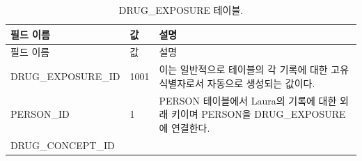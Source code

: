 \documentclass[10.5pt]{book}
\theoremstyle{definition}
\theoremstyle{definition}
\theoremstyle{definition}
\theoremstyle{remark}
\begin{document}
\begin{longtable}[]{@{}lll@{}}
\caption{\label{tab:drugExposure} DRUG\_EXPOSURE 테이블.}\tabularnewline
\toprule
\begin{minipage}[b]{0.28\columnwidth}\raggedright\strut
필드 이름\strut
\end{minipage} & \begin{minipage}[b]{0.16\columnwidth}\raggedright\strut
값\strut
\end{minipage} & \begin{minipage}[b]{0.48\columnwidth}\raggedright\strut
설명\strut
\end{minipage}\tabularnewline
\midrule
\endfirsthead
\toprule
\begin{minipage}[b]{0.28\columnwidth}\raggedright\strut
필드 이름\strut
\end{minipage} & \begin{minipage}[b]{0.16\columnwidth}\raggedright\strut
값\strut
\end{minipage} & \begin{minipage}[b]{0.48\columnwidth}\raggedright\strut
설명\strut
\end{minipage}\tabularnewline
\midrule
\endhead
\begin{minipage}[t]{0.28\columnwidth}\raggedright\strut
DRUG\_EXPOSURE\_ID\strut
\end{minipage} & \begin{minipage}[t]{0.16\columnwidth}\raggedright\strut
1001\strut
\end{minipage} & \begin{minipage}[t]{0.48\columnwidth}\raggedright\strut
이는 일반적으로 테이블의 각 기록에 대한 고유 식별자로서 자동으로
생성되는 값이다.\strut
\end{minipage}\tabularnewline
\begin{minipage}[t]{0.28\columnwidth}\raggedright\strut
PERSON\_ID\strut
\end{minipage} & \begin{minipage}[t]{0.16\columnwidth}\raggedright\strut
1\strut
\end{minipage} & \begin{minipage}[t]{0.48\columnwidth}\raggedright\strut
PERSON 테이블에서 Laura의 기록에 대한 외래 키이며 PERSON을
DRUG\_EXPOSURE에 연결한다.\strut
\end{minipage}\tabularnewline
\begin{minipage}[t]{0.28\columnwidth}\raggedright\strut
DRUG\_CONCEPT\_ID\strut
\end{minipage} & \begin{minipage}[t]{0.16\columnwidth}\raggedright\strut

\end{minipage}
\end{longtable}
\end{document}

